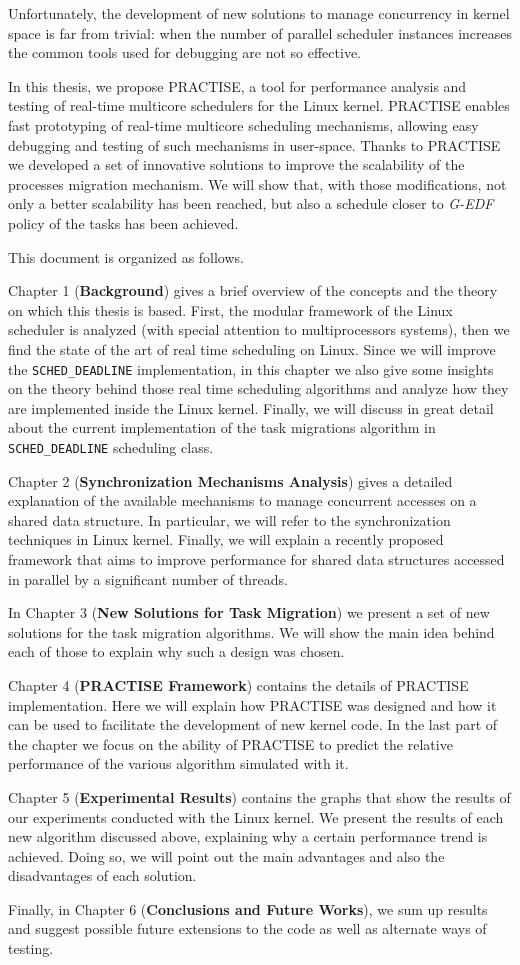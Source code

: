 Unfortunately, the development of new solutions to manage concurrency
in kernel space is far from trivial: when the number of parallel
scheduler instances increases the common tools used for debugging
are not so effective.

In this thesis, we propose PRACTISE, a tool for performance analysis and
testing of real-time multicore schedulers for the Linux kernel. PRACTISE
enables fast prototyping of real-time multicore scheduling mechanisms,
allowing easy debugging and testing of such mechanisms in user-space.
Thanks to PRACTISE we developed a set of innovative solutions to improve
the scalability of the processes migration mechanism. We will show that,
with those modifications, not only a better scalability has been reached,
but also a schedule closer to \emph{G-EDF} policy of the tasks has been
achieved.

This document is organized as follows.

Chapter 1 (\textbf{Background}) gives a brief overview of the concepts and
the theory on which this thesis is based. First, the modular framework of
the Linux scheduler is analyzed (with special attention to multiprocessors
systems), then we find the state of the art of real time scheduling on Linux.
Since we will improve the \texttt{SCHED\_DEADLINE} implementation, in this
chapter we also give some insights on the theory behind those real time
scheduling algorithms and analyze how they are implemented inside the
Linux kernel. Finally, we will discuss in great detail about the
current implementation of the task migrations algorithm in \texttt{SCHED\_DEADLINE}
scheduling class.


Chapter 2 (\textbf{Synchronization Mechanisms Analysis}) gives a detailed
explanation of the available mechanisms to manage concurrent accesses on
a shared data structure. In particular, we will refer to the synchronization
techniques in Linux kernel. Finally, we will explain a recently proposed
framework that aims to improve performance for shared data structures
accessed in parallel by a significant number of threads.


In Chapter 3 (\textbf{New Solutions for Task Migration}) we present a set
of new solutions for the task migration algorithms. We will show the main idea
behind each of those to explain why such a design was chosen.


Chapter 4 (\textbf{PRACTISE Framework}) contains the details of PRACTISE
implementation. Here we will explain how PRACTISE was designed and how it
can be used to facilitate the development of new kernel code. In the last
part of the chapter we focus on the ability of PRACTISE to predict the
relative performance of the various algorithm simulated with it.


Chapter 5 (\textbf{Experimental Results}) contains the graphs that show
the results of our experiments conducted with the Linux kernel. We present
the results of each new algorithm discussed above, explaining why a certain
performance trend is achieved. Doing so, we will point out the main advantages
and also the disadvantages of each solution.


Finally, in Chapter 6 (\textbf{Conclusions and Future Works}), we sum up
results and suggest possible future extensions to the code as well as alternate
ways of testing.
